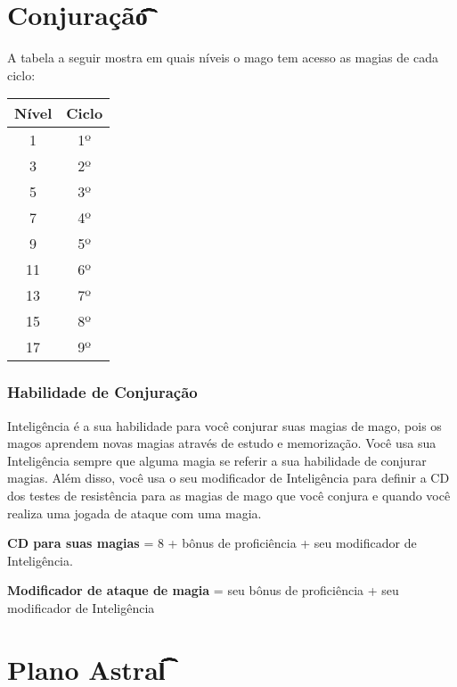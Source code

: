 \documentclass{RPG_Adventure}[2021/10/20]
\begin{document}
\section*{Conjuração\t\t\t\t\t\t\t\t\t\t\t}%
\label{sec:conjuracao}

A tabela a seguir mostra em quais níveis o mago tem acesso as magias de cada
ciclo:

\begin{center}
\begin{tabular}{|||c||c|||}
    \hline
    \textbf{Nível} & \textbf{Ciclo} \\
    \hline
    1 & 1º \\
    \hline
    3 & 2º \\
    \hline
    5 & 3º \\
    \hline
    7 & 4º \\
    \hline
    9 & 5º \\
    \hline
    11 & 6º \\
    \hline
    13 & 7º \\
    \hline
    15 & 8º \\
    \hline
    17 & 9º \\
    \hline
\end{tabular}
\end{center}

\subsubsection*{Habilidade de Conjuração}%
\label{ssub:habilidade_de_conjuracao}

Inteligência é a sua habilidade para você conjurar suas magias de mago, pois os
magos aprendem novas magias através de estudo e memorização. Você usa sua
Inteligência sempre que alguma magia se referir a sua habilidade de conjurar
magias. Além disso, você usa o seu modificador de Inteligência para definir a CD
dos testes de resistência para as magias de mago que você conjura e quando você
realiza uma jogada de ataque com uma magia.

\begin{center}
\textbf{CD para suas magias} = 8 + bônus de proficiência + seu modificador de
Inteligência. \nl

\textbf{Modificador de ataque de magia} = seu bônus de proficiência + seu
modificador de Inteligência
\end{center}

\section*{Plano Astral\t\t\t\t\t\t\t\t\t\t}%
\label{sec:plano_astral}
\end{document}
